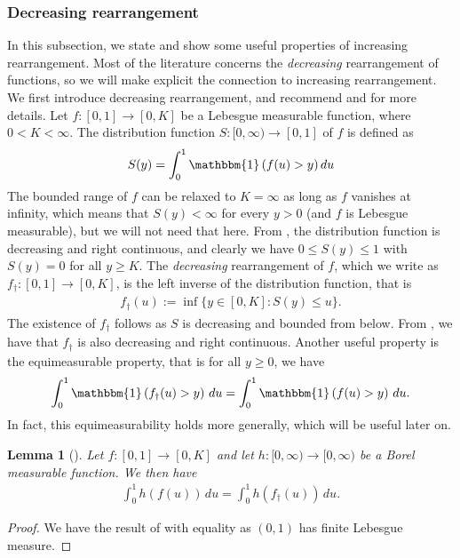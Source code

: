 \documentclass[11pt,a4paper]{article}
\newtheorem{lem}{Lemma}
\begin{document}
\begin{appendices}
\subsubsection{Decreasing rearrangement}
In this subsection, we state and show some useful properties of increasing rearrangement. Most of the literature concerns the \textit{decreasing} rearrangement of functions, so we will make explicit the connection to increasing rearrangement. We first introduce decreasing rearrangement, and recommend  \cite{Kesavan2006} and \citet[Chapter 4]{Leoni2017} for more details. Let $f: [0,1] \to [0,K]$ be a Lebesgue measurable function, where $0<K< \infty$. 
The distribution function $S: [0,\infty) \to [0,1]$ of $f$ is defined as
\begin{align*}
    S(y) = \int_0^1 \mathbbm{1}\left(f(u) > y\right)du
\end{align*}
The bounded range of $f$ can be relaxed to $K = \infty$ as long as $f$ vanishes at infinity, which means that $S(y) < \infty$ for every $y > 0$ (and $f$ is Lebesgue measurable), but we will not need that here. 
From \citet[Proposition 4.1]{Leoni2017}, the distribution function is decreasing and right continuous, and clearly we have $0\leq S(y) \leq 1$ with $S(y) = 0$ for all $y \geq K$. The \textit{decreasing} rearrangement of $f$, which we write as $f_{\dagger}:[0,1] \to [0,K]$, is the left inverse of the distribution function, that is
\begin{align*}
    f_{\dagger}(u):= \inf \{y \in [0,K]: S(y) \leq u\}.
\end{align*}
The existence of $f_{\dagger}$ follows as $S$ is decreasing and bounded from below. From \citet[Proposition 4.3]{Leoni2017}, we have that $f_{\dagger}$ is also decreasing and right continuous. Another useful property is the equimeasurable property, that is for all $y \geq 0$, we have
\begin{align*}
    \int_0^1 \mathbbm{1}\left(f_{\dagger}(u) > y\right)\, du =  \int_0^1 \mathbbm{1}\left(f(u) > y\right)\, du.
\end{align*}
In fact, this equimeasurability holds more generally, which will be useful later on.
\begin{lem}[{\cite[Theorem 4.16]{Leoni2017}}]\label{app:lem_equi}
    Let $f: [0,1] \to [0,K]$ and let $h:[0,\infty) \to [0,\infty)$ be a Borel measurable function. We then have
    \begin{align*}
        \int_0^1 h(f(u))\, du = \int_0^1 h(f_{\dagger}(u))\, du.
    \end{align*}
\end{lem}
\begin{proof}
    We have the result of  \citet[Theorem 4.16]{Leoni2017} with equality as $(0,1)$ has finite Lebesgue measure.
\end{proof}
    


\end{appendices}
\end{document}
